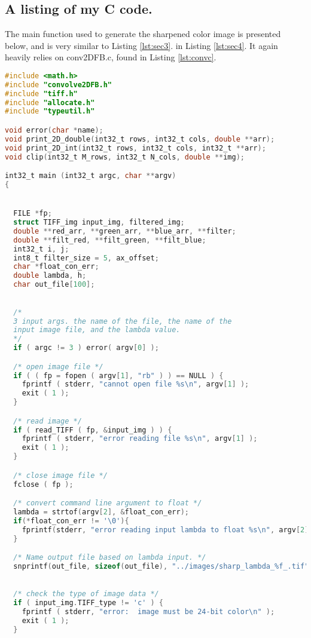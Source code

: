 \documentclass{article}
\begin{document}
\subsection{A listing of my C code.}
The main function used to generate the sharpened color image is presented below, and is very similar to Listing \ref{lst:sec3}. in Listing \ref{lst:sec4}. It again heavily relies on conv2DFB.c, found in Listing \ref{lst:convc}.
\begin{lstlisting}[language=C, caption=filter\_image\_section4.c, label={lst:sec4}]
#include <math.h>
#include "convolve2DFB.h"
#include "tiff.h"
#include "allocate.h"
#include "typeutil.h"

void error(char *name);
void print_2D_double(int32_t rows, int32_t cols, double **arr);
void print_2D_int(int32_t rows, int32_t cols, int32_t **arr);
void clip(int32_t M_rows, int32_t N_cols, double **img);

int32_t main (int32_t argc, char **argv) 
{


  FILE *fp;
  struct TIFF_img input_img, filtered_img;
  double **red_arr, **green_arr, **blue_arr, **filter;
  double **filt_red, **filt_green, **filt_blue;
  int32_t i, j;
  int8_t filter_size = 5, ax_offset;
  char *float_con_err;
  double lambda, h;
  char out_file[100];

  
  /*
  3 input args. the name of the file, the name of the
  input image file, and the lambda value.
  */
  if ( argc != 3 ) error( argv[0] );

  /* open image file */
  if ( ( fp = fopen ( argv[1], "rb" ) ) == NULL ) {
    fprintf ( stderr, "cannot open file %s\n", argv[1] );
    exit ( 1 );
  }

  /* read image */
  if ( read_TIFF ( fp, &input_img ) ) {
    fprintf ( stderr, "error reading file %s\n", argv[1] );
    exit ( 1 );
  }

  /* close image file */
  fclose ( fp );

  /* convert command line argument to float */
  lambda = strtof(argv[2], &float_con_err);
  if(*float_con_err != '\0'){
    fprintf(stderr, "error reading input lambda to float %s\n", argv[2]); 
  }

  /* Name output file based on lambda input. */
  snprintf(out_file, sizeof(out_file), "../images/sharp_lambda_%f_.tif", lambda);
  

  /* check the type of image data */
  if ( input_img.TIFF_type != 'c' ) {
    fprintf ( stderr, "error:  image must be 24-bit color\n" );
    exit ( 1 );
  }


\end{lstlisting}
\end{document}
